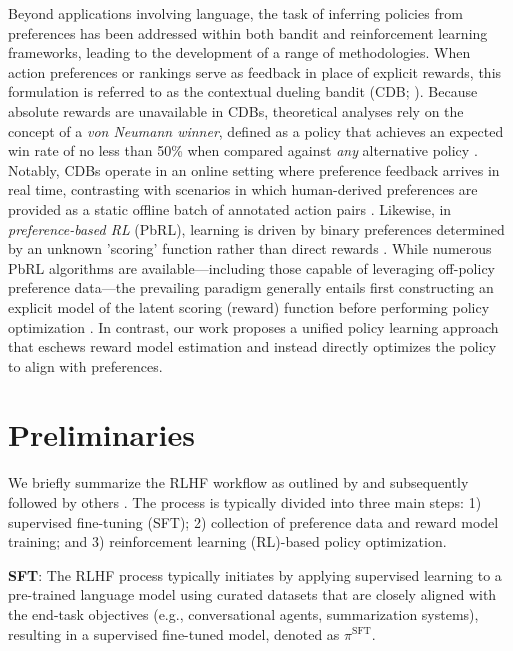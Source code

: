 Beyond applications involving language, the task of inferring policies from preferences has been addressed within both bandit and reinforcement learning frameworks, leading to the development of a range of methodologies. When action preferences or rankings serve as feedback in place of explicit rewards, this formulation is referred to as the contextual dueling bandit (CDB; \cite{yue2012karmed,dudik2015contextual}). Because absolute rewards are unavailable in CDBs, theoretical analyses rely on the concept of a \textit{von Neumann winner}, defined as a policy that achieves an expected win rate of no less than 50\% when compared against \textit{any} alternative policy \citep{dudik2015contextual}. Notably, CDBs operate in an online setting where preference feedback arrives in real time, contrasting with scenarios in which human-derived preferences are provided as a static offline batch of annotated action pairs \citep{yan2022human}. Likewise, in \textit{preference-based RL} (PbRL), learning is driven by binary preferences determined by an unknown 'scoring' function rather than direct rewards \citep{BusaFekete2014,ruiz2023dueling}. While numerous PbRL algorithms are available—including those capable of leveraging off-policy preference data—the prevailing paradigm generally entails first constructing an explicit model of the latent scoring (reward) function before performing policy optimization \citep{jain2013learning,BusaFekete2014,christiano2017deep,sadigh2017active,kupcsik2018learning}. In contrast, our work proposes a unified policy learning approach that eschews reward model estimation and instead directly optimizes the policy to align with preferences.

\section{Preliminaries}\label{section:prelims}

We briefly summarize the RLHF workflow as outlined by \citeauthor{ziegler2020finetuning} and subsequently followed by others \citep{stiennon2022learning, bai2022training, ouyang2022training}. The process is typically divided into three main steps: 1) supervised fine-tuning (SFT); 2) collection of preference data and reward model training; and 3) reinforcement learning (RL)-based policy optimization.

\textbf{SFT}: The RLHF process typically initiates by applying supervised learning to a pre-trained language model using curated datasets that are closely aligned with the end-task objectives (e.g., conversational agents, summarization systems), resulting in a supervised fine-tuned model, denoted as $\pi^\text{SFT}$.


